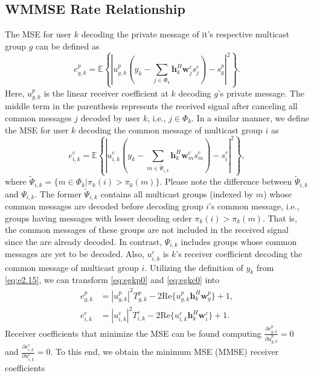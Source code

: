 \documentclass[12pt,draftcls,onecolumn]{IEEEtran}
\theoremstyle{remark}
\theoremstyle{definition}
\begin{document}
{\subsection{WMMSE Rate Relationship}
The MSE for user $k$ decoding the private message of it's respective multicast group $g$ can be defined as
\begin{equation}\label{eq:egkp0}
	e_{g,k}^p = \mathds{E}\left\{ \left| u_{g,k}^p \left(y_k - \sum_{j\in\Phi_k} \mathbf{h}_k^H \mathbf{w}_j^c s_j^c\right) - s_g^p \right|^2 \right\}.
\end{equation}
Here, $u_{g,k}^p$ is the linear receiver coefficient at $k$ decoding $g$'s private message. The middle term in the parenthesis represents the received signal after canceling all common messages $j$ decoded by user $k$, i.e., $j\in\Phi_k$. In a similar manner, we define the MSE for user $k$ decoding the common message of multicast group $i$ as
\begin{equation}\label{eq:egkc0}
	e_{i,k}^c = \mathds{E}\left\{ \left| u_{i,k}^c \left(y_k - \sum_{m\in\tilde{\Psi}_{i,k}} \mathbf{h}_k^H \mathbf{w}_m^c s_m^c\right) - s_i^c \right|^2 \right\},
\end{equation}
where $\tilde{\Psi}_{i,k} = \{ m\in\Phi_k | \pi_k(i) > \pi_k(m) \}$. Please note the difference between $\tilde{\Psi}_{i,k}$ and $\Psi_{i,k}$. The former $\tilde{\Psi}_{i,k}$ contains all multicast groups (indexed by $m$) whose common messages are decoded before decoding group $i$'s common message, i.e., groups having messages with lesser decoding order $\pi_{k}(i)>\pi_{k}(m)$. That is, the common messages of these groups are not included in the received signal since the are already decoded. In contrast, $\Psi_{i,k}$ includes groups whose common messages are yet to be decoded. Also, $u_{i,k}^c$ is $k$'s receiver coefficient decoding the common message of multicast group $i$. Utilizing the definition of $y_k$ from \eqref{eq:e2.15}, we can transform \eqref{eq:egkp0} and \eqref{eq:egkc0} into
\begin{align}
	e_{g,k}^p &= |u_{g,k}^p|^2 T_{g,k}^p - 2 \text{Re}\{ u_{g,k}^p \mathbf{h}_k^H \mathbf{w}_g^p \} + 1, \label{eq:egkp}\\
	e_{i,k}^c &= |u_{i,k}^c|^2 T_{i,k}^c - 2 \text{Re}\{ u_{i,k}^c \mathbf{h}_k^H \mathbf{w}_i^c \} + 1. \label{eq:egkc}
\end{align}
Receiver coefficients that minimize the MSE can be found computing $\frac{\partial e_{g,k}^p}{\partial u_{g,k}^p} = 0$ and $\frac{\partial e_{i,k}^c}{\partial u_{i,k}^c} = 0$. To this end, we obtain the minimum MSE (MMSE) receiver coefficients
}
\end{document}
